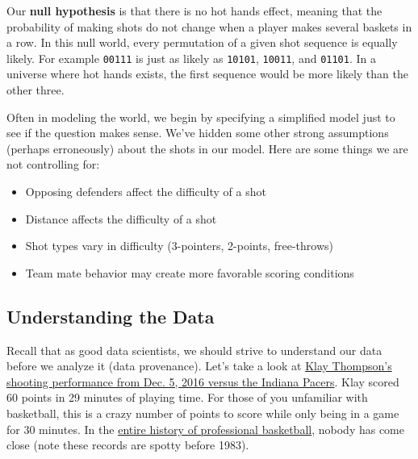\documentclass[11pt]{article}
\providecommand{\tightlist}{%
      \setlength{\itemsep}{0pt}\setlength{\parskip}{0pt}}
\begin{document}
Our \textbf{null hypothesis} is that there is no hot hands effect,
meaning that the probability of making shots do not change when a player
makes several baskets in a row. In this null world, every permutation of
a given shot sequence is equally likely. For example
\texttt{\textquotesingle{}00111\textquotesingle{}} is just as likely as
\texttt{\textquotesingle{}10101\textquotesingle{}},
\texttt{\textquotesingle{}10011\textquotesingle{}}, and
\texttt{\textquotesingle{}01101\textquotesingle{}}. In a universe where
hot hands exists, the first sequence would be more likely than the other
three.

Often in modeling the world, we begin by specifying a simplified model
just to see if the question makes sense. We've hidden some other strong
assumptions (perhaps erroneously) about the shots in our model. Here are
some things we are not controlling for:

\begin{itemize}
\tightlist
\item
  Opposing defenders affect the difficulty of a shot
\item
  Distance affects the difficulty of a shot
\item
  Shot types vary in difficulty (3-pointers, 2-points, free-throws)
\item
  Team mate behavior may create more favorable scoring conditions
\end{itemize}

\subsection{Understanding the Data}\label{understanding-the-data}

Recall that as good data scientists, we should strive to understand our
data before we analyze it (data provenance). Let's take a look at
\href{https://www.basketball-reference.com/play-index/shooting.fcgi?player_id=thompkl01\&year_id=2017\&opp_id=IND\&game_location=H}{Klay
Thompson's shooting performance from Dec. 5, 2016 versus the Indiana
Pacers}. Klay scored 60 points in 29 minutes of playing time. For those
of you unfamiliar with basketball, this is a crazy number of points to
score while only being in a game for 30 minutes. In the
\href{https://www.basketball-reference.com/play-index/pgl_finder.cgi?request=1\&match=game\&is_playoffs=N\&age_min=0\&age_max=99\&pos_is_g=Y\&pos_is_gf=Y\&pos_is_f=Y\&pos_is_fg=Y\&pos_is_fc=Y\&pos_is_c=Y\&pos_is_cf=Y\&c1stat=mp\&c1comp=lt\&c1val=30\&order_by=pts}{entire
history of professional basketball}, nobody has come close (note these
records are spotty before 1983).
\end{document}
